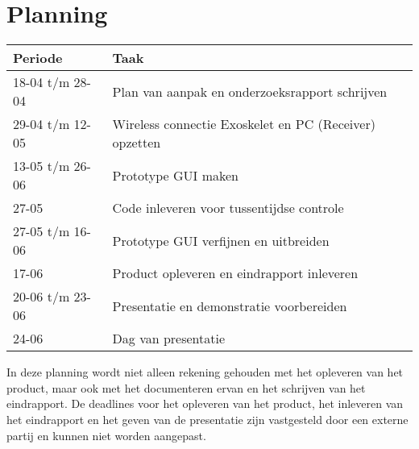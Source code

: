 \section{Planning}
{\renewcommand{\arraystretch}{1.5}
\begin{tabular}{ | l | l | }
	\hline
	\bfseries{Periode} & \bfseries{Taak} \\ \hline
	18-04 t/m 28-04 & Plan van aanpak en onderzoeksrapport schrijven\\ \hline
	29-04 t/m 12-05 & Wireless connectie Exoskelet en PC (Receiver) opzetten   \\ \hline
	13-05 t/m 26-06 & Prototype GUI maken \\ \hline
	27-05 & Code inleveren voor tussentijdse controle \\ \hline 
	27-05 t/m 16-06 & Prototype GUI verfijnen en uitbreiden \\ \hline
	17-06 & Product opleveren en eindrapport inleveren \\ \hline
	20-06 t/m 23-06 & Presentatie en demonstratie voorbereiden \\ \hline
	24-06 & Dag van presentatie \\ \hline
\end{tabular}
}

In deze planning wordt niet alleen rekening gehouden met het opleveren van het product, maar ook met het documenteren ervan en het schrijven van het eindrapport. De deadlines voor het opleveren van het product, het inleveren van het eindrapport en het geven van de presentatie zijn vastgesteld door een externe partij en kunnen niet worden aangepast.

